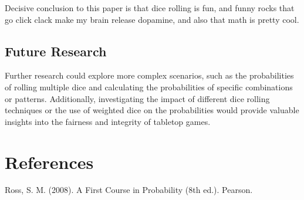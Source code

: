 \documentclass{article}
\begin{document}
Decisive conclusion to this paper is that dice rolling is fun, and funny rocks that go click clack make my brain release
dopamine, and also that math is pretty cool.

\subsection{Future Research}

Further research could explore more complex scenarios, such as the probabilities of rolling multiple dice and
calculating the probabilities of specific combinations or patterns. Additionally, investigating the impact of
different dice rolling techniques or the use of weighted dice on the probabilities would provide valuable insights
into the fairness and integrity of tabletop games.

\section{References}

\begin{thebibliography}{2}
 Ross, S. M. (2008). A First Course in Probability (8th ed.). Pearson.
\end{thebibliography}
\end{document}
